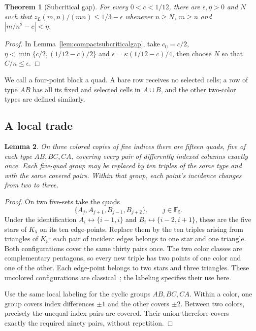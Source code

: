 \documentclass[11pt]{article}
\newtheorem{theorem}{Theorem}
\newtheorem{lemma}[theorem]{Lemma}
\newcommand{\zl}{z_L}
\begin{document}
\begin{theorem}[Subcritical gap]\label{thm:subcriticalgap}
For every $0<c<1/12$, there are $\epsilon,\eta>0$ and $N$ such that
$\zl(m,n)/(mn)\le1/3-\epsilon$ whenever $n\ge N$, $m\ge n$ and
$|m/n^2-c|<\eta$.
\end{theorem}
\begin{proof}
In Lemma~\ref{lem:compactsubcriticalgap}, take $c_0=c/2$,
$\eta<\min\{c/2,(1/12-c)/2\}$ and $\epsilon=\kappa(1/12-c)/4$,
then choose $N$ so that $C/n\le\epsilon$.
\end{proof}

We call a four-point block a quad. A bare row receives no selected cells;
a row of type $AB$ has all its fixed and selected cells in $A\cup B$,
and the other two-color types are defined similarly.

\subsection{A local trade}
\begin{lemma}\label{lem:affinetradeprogression}
On three colored copies of five indices there are fifteen quads,
five of each type $AB,BC,CA$, covering every pair of differently indexed
columns exactly once. Each five-quad group may be replaced by ten triples
of the same type and with the same covered pairs. Within that group,
each point's incidence changes from two to three.
\end{lemma}
\begin{proof}
On two five-sets take the quads
\[
 \{A_j,A_{j+1},B_{j-1},B_{j+2}\},\qquad j\in\mathbb F_5.
\]
Under the identification
$A_i\leftrightarrow\{i-1,i\}$ and $B_i\leftrightarrow\{i-2,i+1\}$,
these are the five stars of $K_5$ on its ten edge-points.
Replace them by the ten triples arising from triangles of $K_5$:
each pair of incident edges belongs to one star and one triangle.
Both configurations cover the same thirty pairs once.
The two color classes are complementary pentagons, so every new triple
has two points of one color and one of the other.
Each edge-point belongs to two stars and three triangles.
These uncolored configurations are classical~\cite{brouwer}; the labeling
specifies their use here.

Use the same local labeling for the cyclic groups $AB,BC,CA$.
Within a color, one group covers index differences $\pm1$ and the other
covers $\pm2$. Between two colors, precisely the unequal-index pairs
are covered. Their union therefore covers exactly the required ninety
pairs, without repetition.
\end{proof}
\end{document}
